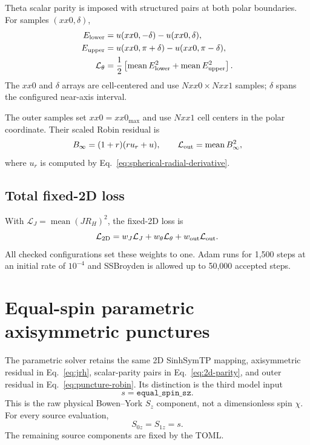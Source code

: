 \documentclass[11pt]{article}
\newcommand{\mean}{\operatorname{mean}}
\newcommand{\JRH}{J R_H}
\begin{document}
Theta scalar parity is imposed with structured pairs at both polar
boundaries.  For samples $(xx0,\delta)$,
\begin{align}
 E_{\rm lower} &=u(xx0,-\delta)-u(xx0,\delta),\\
 E_{\rm upper} &=u(xx0,\pi+\delta)-u(xx0,\pi-\delta),\\
 \mathcal{L}_{\theta} &=\frac12\left[
 \mean E_{\rm lower}^2+\mean E_{\rm upper}^2\right].
 \label{eq:2d-parity}
\end{align}
The $xx0$ and $\delta$ arrays are cell-centered and use $Nxx0\times Nxx1$
samples; $\delta$ spans the configured near-axis interval.

The outer samples set $xx0=xx0_{\max}$ and use $Nxx1$ cell centers in the
polar coordinate.  Their scaled Robin residual is
\begin{equation}
 B_{\infty}=(1+r)(ru_r+u),
 \qquad
 \mathcal{L}_{\rm out}=\mean B_{\infty}^2,
 \label{eq:puncture-robin}
\end{equation}
where $u_r$ is computed by Eq.~\eqref{eq:spherical-radial-derivative}.

\subsection{Total fixed-2D loss}

With $\mathcal{L}_{J}=\mean(\JRH)^2$, the fixed-2D loss is
\begin{equation}
 \mathcal{L}_{\rm 2D}=
 w_J\mathcal{L}_{J}+w_{\theta}\mathcal{L}_{\theta}
 +w_{\rm out}\mathcal{L}_{\rm out}.
 \label{eq:fixed-2d-loss}
\end{equation}
All checked configurations set these weights to one.  Adam runs for 1,500
steps at an initial rate of $10^{-4}$ and SSBroyden is allowed up to 50,000
accepted steps.

\section{Equal-spin parametric axisymmetric punctures}

The parametric solver retains the same 2D SinhSymTP mapping, axisymmetric
residual in Eq.~\eqref{eq:jrh}, scalar-parity pairs in
Eq.~\eqref{eq:2d-parity}, and outer residual in
Eq.~\eqref{eq:puncture-robin}.  Its distinction is the third model input
\begin{equation}
 s=\texttt{equal\_spin\_sz}.
\end{equation}
This is the raw physical Bowen--York $S_z$ component, not a dimensionless spin
$\chi$.  For every source evaluation,
\begin{equation}
 S_{0z}=S_{1z}=s.
\end{equation}
The remaining source components are fixed by the TOML.
\end{document}
